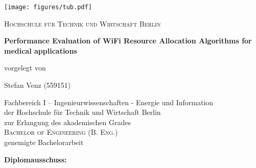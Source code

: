 
\begin{titlepage}
  \begin{center}
	  


	\centering
	\texttt{[image: figures/tub.pdf]}\\
	\vspace{0.8em}
	\LARGE 

	\textsc{Hochschule für Technik und Wirtschaft Berlin}

    \vspace{1cm}

    \sffamily \LARGE \textbf{Performance Evaluation of WiFi Resource Allocation Algorithms for medical applications }

    \vspace{1.5cm}





    \normalsize vorgelegt von

    \vspace{.1cm}

    \large Stefan Venz (559151)

    \vspace{.8cm}



    \normalsize Fachbereich I -- Ingenieurwissenschaften - Energie und Information\\
    \normalsize der Hochschule für Technik und Wirtschaft Berlin\\
    \normalsize zur Erlangung des akademischen Grades\\
    \large \textsc{Bachelor of Engineering (B. Eng.)}\\
    \normalsize genemigte Bachelorarbeit\\

    \vspace{1cm}

    \large \textbf{Diplomausschuss:}

    \vspace{.2cm}


\end{center}
\end{titlepage}
